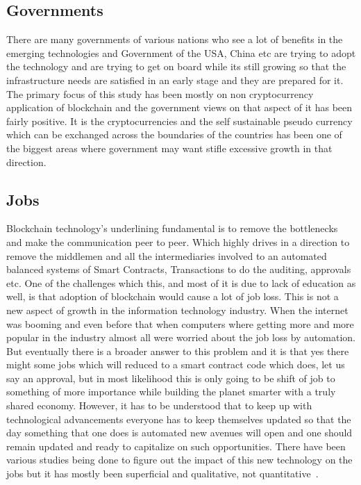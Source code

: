 \subsection{Governments}

There are many governments of various nations who see a lot of
benefits in the emerging technologies and Government of the USA, China
etc are trying to adopt the technology and are trying to get on board
while its still growing so that the infrastructure needs are satisfied
in an early stage and they are prepared for it. The primary focus of
this study has been mostly on non cryptocurrency application of
blockchain and the government views on that aspect of it has been
fairly positive. It is the cryptocurrencies and the self sustainable
pseudo currency which can be exchanged across the boundaries of the
countries has been one of the biggest areas where government may want
stifle excessive growth in that direction.

\subsection{Jobs}

Blockchain technology's underlining fundamental is to remove the
bottlenecks and make the communication peer to peer. Which highly
drives in a direction to remove the middlemen and all the
intermediaries involved to an automated balanced systems of Smart
Contracts, Transactions to do the auditing, approvals etc. One of the
challenges which this, and most of it is due to lack of education as
well, is that adoption of blockchain would cause a lot of job loss.
This is not a new aspect of growth in the information technology
industry. When the internet was booming and even before that when
computers where getting more and more popular in the industry almost
all were worried about the job loss by automation. But eventually
there is a broader answer to this problem and it is that yes there
might some jobs which will reduced to a smart contract code which
does, let us say an approval, but in most likelihood this is only going
to be shift of job to something of more importance while building the
planet smarter with a truly shared economy. However, it has to be
understood that to keep up with technological advancements everyone
has to keep themselves updated so that the day something that one does
is automated new avenues will open and one should remain updated and
ready to capitalize on such opportunities. There have been various
studies being done to figure out the impact of this new technology on
the jobs but it has mostly been superficial and qualitative, not
quantitative~\cite{michael34}.

